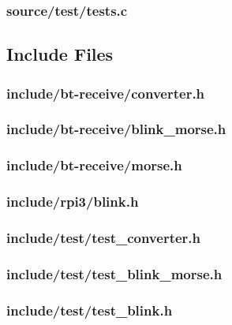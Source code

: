 \subsubsection*{source/test/tests.c}




\subsection{Include Files}


\subsubsection*{include/bt-receive/converter.h}


\subsubsection*{include/bt-receive/blink\_morse.h}


\subsubsection*{include/bt-receive/morse.h}


\subsubsection*{include/rpi3/blink.h}


\subsubsection*{include/test/test\_converter.h}


\subsubsection*{include/test/test\_blink\_morse.h}


\subsubsection*{include/test/test\_blink.h}


